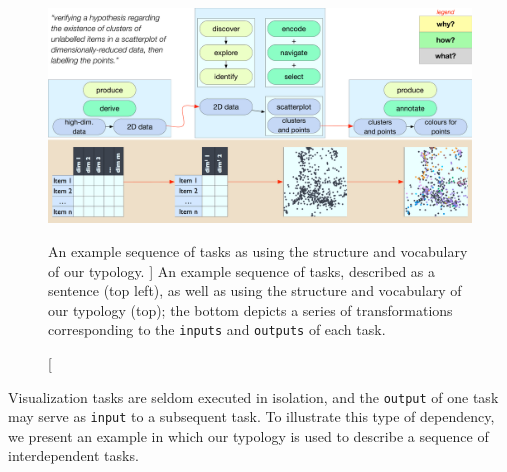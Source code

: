 

\begin{figure}
    \centering
    \includegraphics[width=\textwidth]{figures/typology-example.pdf}
    \caption
    [
        An example sequence of tasks as using the structure and vocabulary of our typology.
    ]
    {
        An example sequence of tasks, described as a sentence (top left), as well as using the structure and vocabulary of our typology (top); the bottom depicts a series of transformations corresponding to the {\tt inputs} and {\tt outputs} of each task.
    }
    \label{typology:fig:task_chain}
\end{figure}


Visualization tasks are seldom executed in isolation, and the {\tt output} of one task may serve as {\tt input} to a subsequent task.
To illustrate this type of dependency, we present an example in which our typology is used to describe a sequence of interdependent tasks.

